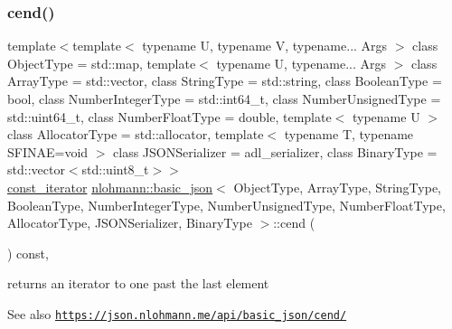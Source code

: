 \subsubsection{\texorpdfstring{cend()}{cend()}}
{\footnotesize\ttfamily template$<$template$<$ typename U, typename V, typename... Args $>$ class Object\+Type = std\+::map, template$<$ typename U, typename... Args $>$ class Array\+Type = std\+::vector, class String\+Type  = std\+::string, class Boolean\+Type  = bool, class Number\+Integer\+Type  = std\+::int64\+\_\+t, class Number\+Unsigned\+Type  = std\+::uint64\+\_\+t, class Number\+Float\+Type  = double, template$<$ typename U $>$ class Allocator\+Type = std\+::allocator, template$<$ typename T, typename S\+F\+I\+N\+A\+E=void $>$ class J\+S\+O\+N\+Serializer = adl\+\_\+serializer, class Binary\+Type  = std\+::vector$<$std\+::uint8\+\_\+t$>$$>$ \\
\hyperlink{classnlohmann_1_1basic__json_aebd2cfa7e4ded4e97cde9269bfeeea38}{const\+\_\+iterator} \hyperlink{classnlohmann_1_1basic__json}{nlohmann\+::basic\+\_\+json}$<$ Object\+Type, Array\+Type, String\+Type, Boolean\+Type, Number\+Integer\+Type, Number\+Unsigned\+Type, Number\+Float\+Type, Allocator\+Type, J\+S\+O\+N\+Serializer, Binary\+Type $>$\+::cend (\begin{DoxyParamCaption}{ }\end{DoxyParamCaption}) const\hspace{0.3cm}{\ttfamily [inline]}, {\ttfamily [noexcept]}}



returns an iterator to one past the last element 

\begin{DoxySeeAlso}{See also}
\href{https://json.nlohmann.me/api/basic_json/cend/}{\tt https\+://json.\+nlohmann.\+me/api/basic\+\_\+json/cend/} 
\end{DoxySeeAlso}
\mbox{\label{classnlohmann_1_1basic__json_a946cc8f30d8b1d6609b57387b647fe53}} 

